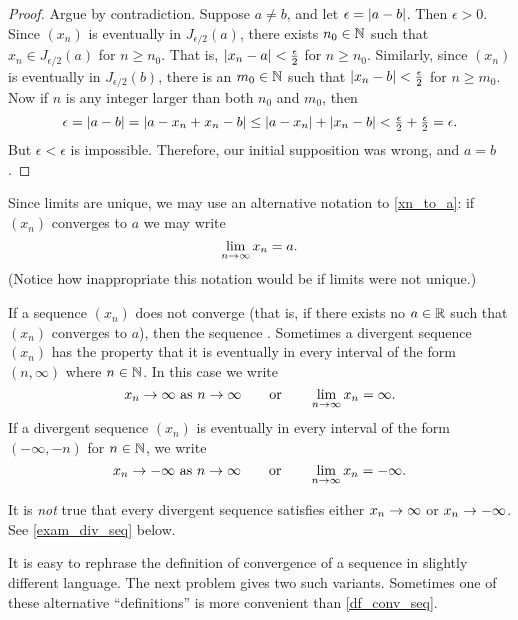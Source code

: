 \begin{proof} Argue by contradiction.  Suppose $a \ne b$, and let $\epsilon = \lvert a-b\rvert$. Then
$\epsilon > 0$. Since $(x_n)$ is eventually in $J_{\epsilon/2}(a)$, there exists $n_0 \in \mathbb{N}$
such that $x_n \in J_{\epsilon/2}(a)$ for $n \ge n_0$.  That is, $\lvert x_n - a\rvert <
\frac\epsilon2$ for $n \ge n_0$.  Similarly, since $(x_n)$ is eventually in
$J_{\epsilon/2}(b)$, there is an $m_0 \in \mathbb{N}$ such that $\lvert x_n-b\rvert < \frac\epsilon2$ for $n
\ge m_0$.  Now if $n$ is any integer larger than both $n_0$ and $m_0$, then
   \[\epsilon = \lvert a-b\rvert = \lvert a-x_n+x_n-b\rvert \le \lvert a-x_n\rvert +
              \lvert x_n-b\rvert < \tfrac\epsilon2 + \tfrac\epsilon2 = \epsilon.\]
But $\epsilon < \epsilon$ is impossible. Therefore, our initial supposition was wrong, and $a
= b$.
\end{proof}

Since limits are unique, we may use an alternative notation to \eqref{xn_to_a}: if $(x_n)$
converges to $a$ we may write
              \[\lim_{n \rightarrow \infty}x_n = a.\]
(Notice how inappropriate this notation would be if limits were not unique.)

\begin{defn} If a sequence $(x_n)$ does not converge (that is, if there exists no $a \in \mathbb{R}$
such that $(x_n)$ converges to $a$), then the sequence
.  Sometimes a divergent sequence $(x_n)$ has the property that it is eventually
in every interval of the form $(n,\infty)$ where $n \in \mathbb{N}$. In this case we write
   \[x_n \rightarrow \infty \text{ as $n \rightarrow \infty$} \qquad \text{or} \qquad
                          \lim_{n \rightarrow \infty}x_n = \infty.\]
If a divergent sequence $(x_n)$ is eventually in every interval of
the form $(-\infty,-n)$ for $n \in \mathbb{N}$, we write
   \[x_n \rightarrow -\infty \text{ as $n \rightarrow \infty$} \qquad \text{or} \qquad
                               \lim_{n \rightarrow \infty}x_n = -\infty.\]
\end{defn}

\begin{cau} It is \emph{not} true that every divergent sequence satisfies either $x_n \rightarrow \infty$
or $x_n \rightarrow -\infty$.  See \ref{exam_div_seq} below.
\end{cau}

It is easy to rephrase the definition of convergence of a sequence in slightly different
language.  The next problem gives two such variants.  Sometimes one of these alternative
``definitions'' is more convenient than \ref{df_conv_seq}.

